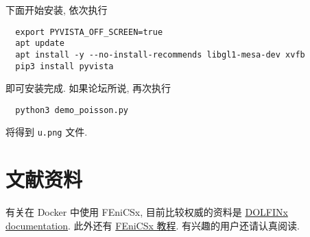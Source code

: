 \documentclass[fontset=founder]{ctexrep}
\begin{document}
下面开始安装,
依次执行
\begin{lstlisting}
  export PYVISTA_OFF_SCREEN=true
  apt update
  apt install -y --no-install-recommends libgl1-mesa-dev xvfb
  pip3 install pyvista
\end{lstlisting}
即可安装完成.
如果论坛所说,
再次执行
\begin{lstlisting}
  python3 demo_poisson.py
\end{lstlisting}
将得到 \texttt{u.png} 文件.

\section{文献资料}

有关在 Docker 中使用 FEniCSx,
目前比较权威的资料是 \href{https://docs.fenicsproject.org/dolfinx/main/python/index.html}{DOLFINx documentation}.
此外还有  \href{https://jorgensd.github.io/dolfinx-tutorial/index.html}{FEniCSx 教程}.
有兴趣的用户还请认真阅读.
\end{document}
